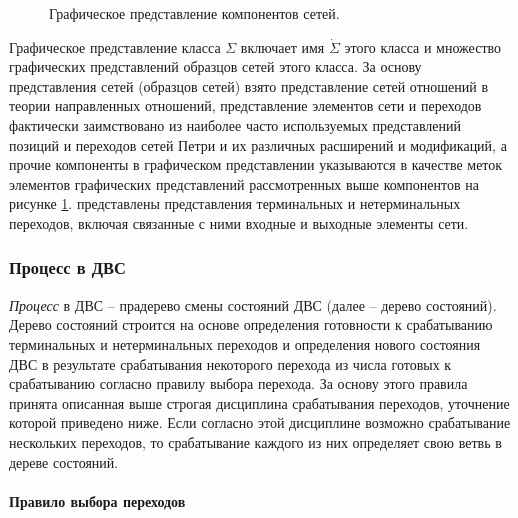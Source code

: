 		\begin{figure}[h!]
			\begin{minipage}[ht]{0.49\linewidth}
			\end{minipage}
			\hfill
			\begin{minipage}[ht]{0.49\linewidth}
			\end{minipage}
			\caption{Графическое представление компонентов сетей.}
			\label{img:components}  
		\end{figure}
		
		Графическое представление класса $\Sigma$ включает имя $\dot{\Sigma}$ этого класса 
		и множество графических представлений образцов сетей этого класса. За основу представления сетей (образцов сетей) 
		взято представление сетей отношений в теории направленных отношений, представление элементов сети и переходов 
		фактически заимствовано из наиболее часто используемых представлений позиций и переходов сетей Петри 
		и их различных расширений и модификаций, а прочие компоненты в графическом представлении указываются 
		в качестве меток элементов графических представлений рассмотренных выше компонентов на рисунке \ref{img:components}.
		представлены представления терминальных и нетерминальных переходов, включая связанные с ними входные и выходные элементы сети.

	
	\subsubsection{Процесс в ДВС}
		\textit{Процесс} в ДВС -- прадерево смены состояний ДВС (далее -- дерево состояний). Дерево состояний строится на основе определения готовности к срабатыванию терминальных и нетерминальных переходов и определения нового состояния ДВС в результате срабатывания некоторого перехода из числа готовых к срабатыванию согласно правилу выбора перехода.
		За основу этого правила принята описанная выше строгая дисциплина срабатывания переходов, уточнение которой приведено ниже. Если согласно этой дисциплине возможно срабатывание нескольких переходов, то срабатывание каждого из них определяет свою ветвь в дереве состояний.
	
	\paragraph{Правило выбора переходов}

